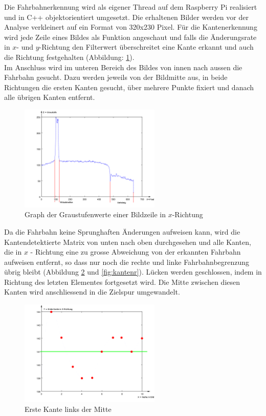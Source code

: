 Die Fahrbahnerkennung wird als eigener Thread auf dem Raspberry Pi realisiert und in C++ objektorientiert umgesetzt. Die erhaltenen Bilder werden vor der Analyse verkleinert auf ein Format von 320x230 Pixel. Für die Kantenerkennung wird jede Zeile eines Bildes als Funktion angeschaut und falls die Änderungsrate in $x$- und $y$-Richtung den Filterwert überschreitet eine Kante erkannt und auch die Richtung festgehalten (Abbildung: \ref{fig:grayscale}).\\
Im Anschluss wird im unteren Bereich des Bildes von innen nach aussen die Fahrbahn gesucht. Dazu werden jeweils von der Bildmitte aus, in beide Richtungen die ersten Kanten gesucht, über mehrere Punkte fixiert und danach alle übrigen Kanten entfernt.
\begin{figure}[H]%
\centering
\includegraphics[width=0.6\textwidth]{03_Loesungskonzept/pictures/graphPicture.png}
\caption{Graph der Graustufenwerte einer Bildzeile in $x$-Richtung}
\label{fig:grayscale}
\end{figure}\flushleft
Da die Fahrbahn keine Sprunghaften Änderungen aufweisen kann, wird die Kantendetektierte Matrix von unten nach oben durchgesehen und alle Kanten, die in $x$ - Richtung eine zu grosse Abweichung von der erkannten Fahrbahn aufweisen entfernt, so dass nur noch die rechte und linke Fahrbahnbegrenzung übrig bleibt (Abbildung \ref{fig:kantenl} und \ref{fig:kantenr}). Lücken werden geschlossen, indem in Richtung des letzten Elementes fortgesetzt wird. Die Mitte zwischen diesen Kanten wird anschliessend in die Zielspur umgewandelt.
\begin{figure}[H]
\centering
\includegraphics[width=0.6\textwidth]{03_Loesungskonzept/pictures/minEdge.png}
\caption{Erste Kante links der Mitte}
\label{fig:kantenl}
\end{figure}
